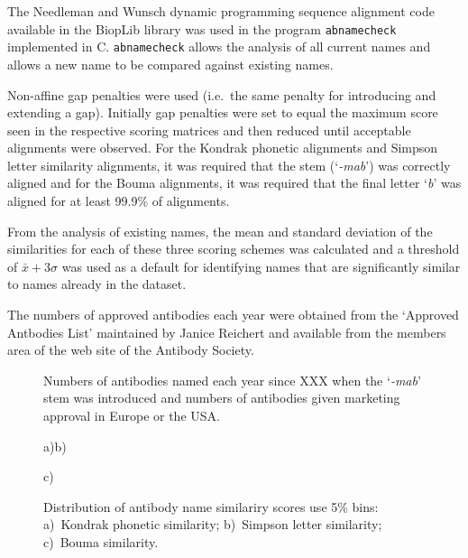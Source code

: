 \documentclass{article}
\newcommand{\eg}[1]{`\emph{#1}'}
\begin{document}
The Needleman and Wunsch dynamic programming sequence alignment code
available in the BiopLib\cite{porter:bioplib} library was used in the
program \verb|abnamecheck| implemented in C. \verb|abnamecheck| allows
the analysis of all current names and allows a new name to be compared
against existing names.

Non-affine gap penalties were used (i.e.\ the same penalty for
introducing and extending a gap). Initially gap penalties were set to
equal the maximum score seen in the respective scoring matrices and
then reduced until acceptable alignments were observed. For the
Kondrak phonetic alignments and Simpson letter similarity alignments,
it was required that the stem (\eg{-mab}) was correctly aligned and
for the Bouma alignments, it was required that the final letter \eg{b}
was aligned for at least 99.9\% of alignments.

From the analysis of existing names, the mean and standard deviation
of the similarities for each of these three scoring schemes was
calculated and a threshold of $\bar{x} + 3\sigma$ was used as a
default for identifying names that are significantly similar to names
already in the dataset.

The numbers of approved antibodies each year were obtained from the
`Approved Antbodies List' maintained by Janice Reichert and available
from the members area of the web site of the Antibody Society.



\begin{figure}
\caption{\label{fig:namesandapproved}Numbers of antibodies named each
  year since XXX when the \eg{-mab} stem was introduced and numbers of
  antibodies given marketing approval in Europe or the USA.}
\end{figure}



\begin{figure}
\noindent a)\hfill b)\hfill\hfill

  \hfill
 \vspace{2em}

 \noindent c)


 \caption{\label{fig:distrib} Distribution of antibody name similariry
   scores use 5\% bins: a)~Kondrak phonetic similarity; b)~Simpson
   letter similarity; c)~Bouma similarity.}
\end{figure}
\end{document}
